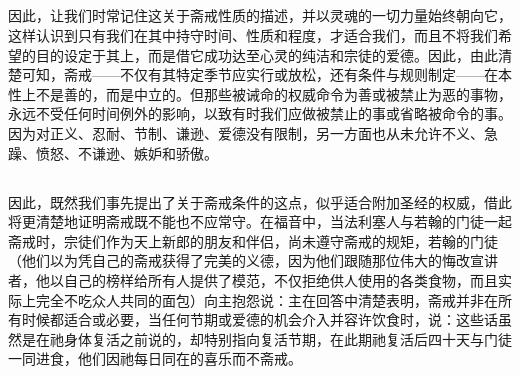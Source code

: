 
\subsection{}

\par

因此，让我们时常记住这关于斋戒性质的描述，并以灵魂的一切力量始终朝向它，这样认识到只有我们在其中持守时间、性质和程度，才适合我们，而且不将我们希望的目的设定于其上，而是借它成功达至心灵的纯洁和宗徒的爱德。因此，由此清楚可知，斋戒——不仅有其特定季节应实行或放松，还有条件与规则制定——在本性上不是善的，而是中立的。但那些被诫命的权威命令为善或被禁止为恶的事物，永远不受任何时间例外的影响，以致有时我们应做被禁止的事或省略被命令的事。因为对正义、忍耐、节制、谦逊、爱德没有限制，另一方面也从未允许不义、急躁、愤怒、不谦逊、嫉妒和骄傲。\par


\subsection{}

\par

因此，既然我们事先提出了关于斋戒条件的这点，似乎适合附加圣经的权威，借此将更清楚地证明斋戒既不能也不应常守。在福音中，当法利塞人与若翰的门徒一起斋戒时，宗徒们作为天上新郎的朋友和伴侣，尚未遵守斋戒的规矩，若翰的门徒（他们以为凭自己的斋戒获得了完美的义德，因为他们跟随那位伟大的悔改宣讲者，他以自己的榜样给所有人提供了模范，不仅拒绝供人使用的各类食物，而且实际上完全不吃众人共同的面包）向主抱怨说：主在回答中清楚表明，斋戒并非在所有时候都适合或必要，当任何节期或爱德的机会介入并容许饮食时，说：这些话虽然是在祂身体复活之前说的，却特别指向复活节期，在此期祂复活后四十天与门徒一同进食，他们因祂每日同在的喜乐而不斋戒。\par


\subsection{}

